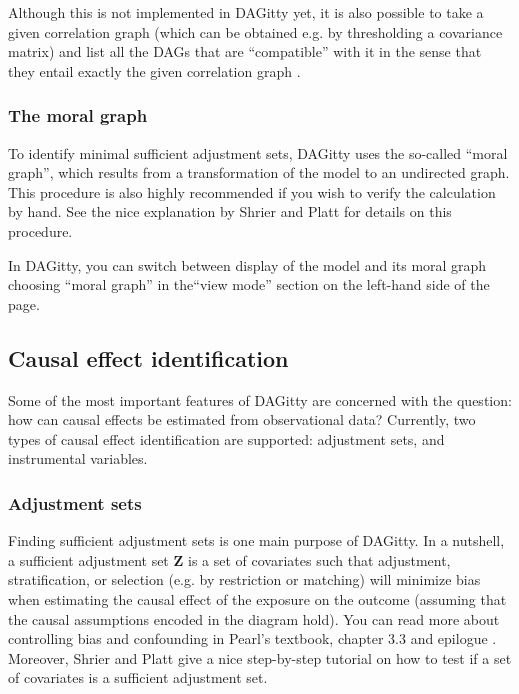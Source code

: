 \documentclass[a4paper,10pt]{article}
\newcommand{\pname}{{\sc DAG}itty\xspace}
\begin{document}
Although this is not implemented in \pname yet, it is also possible to take a given 
correlation graph (which can be obtained e.g. by thresholding a covariance matrix) and 
list all the DAGs that are ``compatible'' with it in the sense that they entail exactly
the given correlation graph \cite{textor15_uai}.

\subsubsection{The moral graph}

To identify minimal sufficient adjustment sets, \pname uses the so-called ``moral graph'',
which results from a transformation of the model to an undirected graph.
This procedure is also highly recommended if you wish to verify the calculation by hand.
See the nice explanation by Shrier and Platt \cite{ShrierP2008} for details on this
procedure.  

In \pname, you can switch between display of the model and its moral graph 
choosing ``moral graph'' in the``view mode'' section on the left-hand
side of the page.

\subsection{Causal effect identification}

Some of the most important features of \pname are concerned with the question: how
can causal effects be estimated from observational data? Currently, two types of causal
effect identification are supported: adjustment sets, and instrumental variables.

\subsubsection{Adjustment sets}

\label{sec:adjustment}

Finding sufficient adjustment sets is one main purpose 
of \pname. In a nutshell, a sufficient adjustment
set $\mathbf{Z}$ is a set of covariates such that adjustment,
stratification, or selection (e.g. by restriction or 
matching) will minimize bias when estimating the causal 
effect of the exposure on the outcome (assuming that
the causal assumptions encoded in the diagram hold). 
You can read more about controlling bias and confounding in Pearl's textbook, 
chapter 3.3 and epilogue \cite{Pearl2009}. 
Moreover, Shrier and Platt \cite{ShrierP2008} 
give a nice step-by-step tutorial on how to test if a set of covariates
is a sufficient adjustment set.
\end{document}
